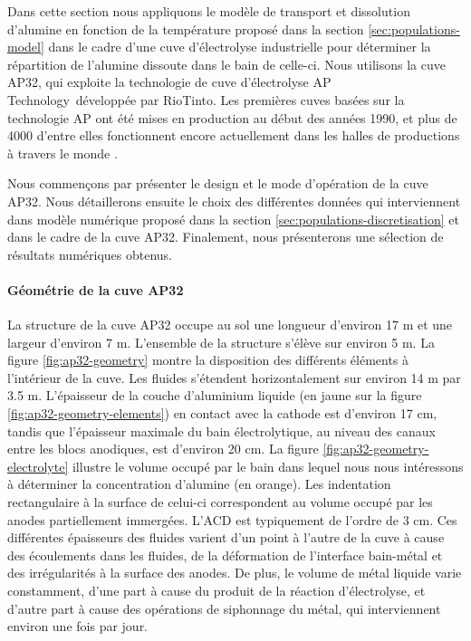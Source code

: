 Dans cette section nous appliquons le modèle de transport et
dissolution d'alumine en fonction de la température proposé dans la
section \ref{sec:populations-model} dans le cadre d'une cuve
d'électrolyse industrielle pour déterminer la répartition de l'alumine
dissoute dans le bain de celle-ci. Nous utilisons la cuve AP32, qui
exploite la technologie de cuve d'électrolyse AP
Technology\texttrademark\ développée par RioTinto. Les premières cuves
basées sur la technologie AP ont été mises en production au début des
années 1990, et plus de \num{4000} d'entre elles fonctionnent encore
actuellement dans les halles de productions à travers le monde
\cite{RiotintoAP30}.

Nous commençons par présenter le design et le mode d'opération de la
cuve AP32. Nous détaillerons ensuite le choix des différentes données
qui interviennent dans modèle numérique proposé dans la section
\ref{sec:populations-discretisation} et dans le cadre de la cuve
AP32. Finalement, nous présenterons une sélection de résultats
numériques obtenus.

\paragraph{Géométrie de la cuve AP32} La structure de la cuve AP32
occupe au sol une longueur d'environ \num{17} \si{\meter} et une
largeur d'environ \num{7} \si{\meter}. L'ensemble de la structure
s'élève sur environ \num{5} \si{\meter}. La figure
\ref{fig:ap32-geometry} montre la disposition des différents éléments
à l'intérieur de la cuve. Les fluides s'étendent horizontalement sur
environ \num{14} \si{\meter} par \num{3.5} \si{\meter}. L'épaisseur de
la couche d'aluminium liquide (en jaune sur la figure
\ref{fig:ap32-geometry-elements}) en contact avec la cathode est
d'environ \num{17} \si{\centi\meter}, tandis que l'épaisseur maximale
du bain électrolytique, au niveau des canaux entre les blocs
anodiques, est d'environ \num{20} \si{\centi\meter}. La figure
\ref{fig:ap32-geometry-electrolyte} illustre le volume occupé par le
bain dans lequel nous nous intéressons à déterminer la concentration
d'alumine (en orange). Les indentation rectangulaire à la surface de
celui-ci correspondent au volume occupé par les anodes partiellement
immergées. L'ACD est typiquement de l'ordre de \num{3}
\si{\centi\meter}. Ces différentes épaisseurs des fluides varient d'un
point à l'autre de la cuve à cause des écoulements dans les fluides,
de la déformation de l'interface bain-métal et des irrégularités à la
surface des anodes. De plus, le volume de métal liquide varie
constamment, d'une part à cause du produit de la réaction
d'électrolyse, et d'autre part à cause des opérations de siphonnage du
métal, qui interviennent environ une fois par jour.

